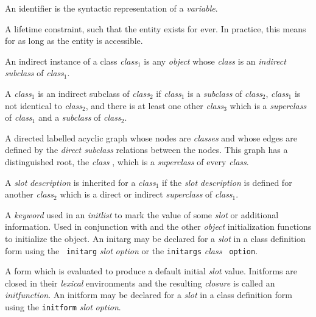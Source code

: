 \begin{optDefinition}
\begin{definitions}
     An identifier is the
    syntactic representation of a {\em variable}.

     A lifetime
    constraint, such that the entity exists for ever.  In practice, this means
    for as long as the entity is accessible.

     An indirect instance of a
    class {\em class$_1$} is any {\em object} whose {\em class} is an {\em
        indirect} {\em subclass} of {\em class$_1$}.

     A {\em class$_1$} is an
    indirect subclass of {\em class$_2$} if {\em class$_1$} is a {\em subclass}
    of {\em class$_2$}, {\em class$_1$} is not identical to {\em class$_2$}, and
    there is at least one other {\em class$_3$} which is a {\em superclass} of
    {\em class$_1$} and a {\em subclass} of {\em class$_2$}.

      A directed
    labelled acyclic graph whose nodes are {\em classes} and whose edges are
    defined by the {\em direct subclass} relations between the nodes.  This
    graph has a distinguished root, the {\em class} , which is
    a {\em superclass} of every {\em class}.

     A {\em slot} {\em description} is inherited for a {\em
        class$_1$} if the {\em slot} {\em description} is defined for another
    {\em class$_2$} which is a direct or indirect {\em superclass} of {\em
        class$_1$}.

      A {\em keyword} used in an
    {\em initlist} to mark the value of some {\em slot} or additional
    information.  Used in conjunction with  and the other {\em
        object} initialization functions to initialize the object.  An initarg
    may be declared for a {\em slot} in a class definition form using the {\tt
        initarg} {\em slot} {\em option} or the {\tt initargs} {\em class} {\tt
        option}.

      A form which is evaluated to
    produce a default initial {\em slot} value.  Initforms are closed in their
    {\em lexical} environments and the resulting {\em closure} is called an {\em
        initfunction}.  An initform may be declared for a {\em slot} in a class
    definition form using the {\tt initform} {\em slot} {\em option}.


\end{definitions}
\end{optDefinition}
